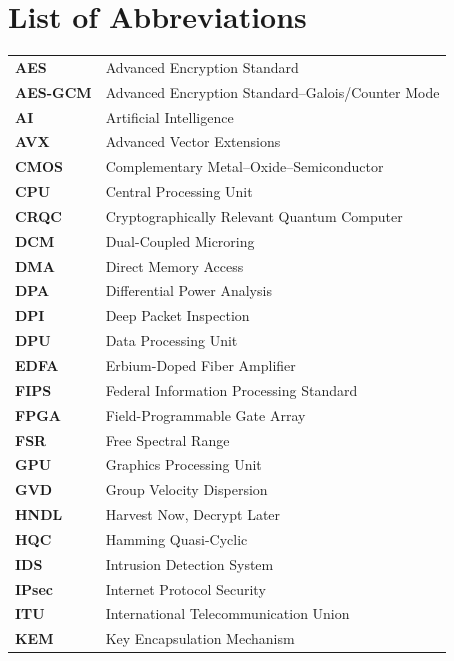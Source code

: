 \chapter*{List of Abbreviations}

\begingroup
\setlength{\LTleft}{0pt}
\setlength{\LTright}{\fill}
\renewcommand{\arraystretch}{1.2}

\begin{longtable}{@{}p{}@{\hspace{1em}}p{}@{}}
\textbf{AES} & Advanced Encryption Standard \\
\textbf{AES-GCM} & Advanced Encryption Standard--Galois/Counter Mode \\
\textbf{AI} & Artificial Intelligence \\
\textbf{AVX} & Advanced Vector Extensions \\
\textbf{CMOS} & Complementary Metal--Oxide--Semiconductor \\
\textbf{CPU} & Central Processing Unit \\
\textbf{CRQC} & Cryptographically Relevant Quantum Computer \\
\textbf{DCM} & Dual-Coupled Microring \\
\textbf{DMA} & Direct Memory Access \\
\textbf{DPA} & Differential Power Analysis \\
\textbf{DPI} & Deep Packet Inspection \\
\textbf{DPU} & Data Processing Unit \\
\textbf{EDFA} & Erbium-Doped Fiber Amplifier \\
\textbf{FIPS} & Federal Information Processing Standard \\
\textbf{FPGA} & Field-Programmable Gate Array \\
\textbf{FSR} & Free Spectral Range \\
\textbf{GPU} & Graphics Processing Unit \\
\textbf{GVD} & Group Velocity Dispersion \\
\textbf{HNDL} & Harvest Now, Decrypt Later \\
\textbf{HQC} & Hamming Quasi-Cyclic \\
\textbf{IDS} & Intrusion Detection System \\
\textbf{IPsec} & Internet Protocol Security \\
\textbf{ITU} & International Telecommunication Union \\
\textbf{KEM} & Key Encapsulation Mechanism \\

\end{longtable}
